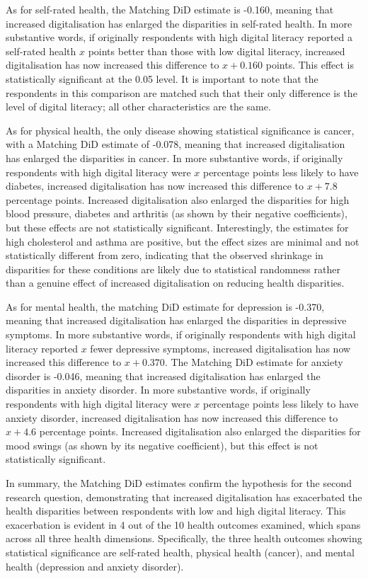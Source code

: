 As for self-rated health, the Matching DiD estimate is -0.160, meaning that increased digitalisation has enlarged the disparities in self-rated health. In more substantive words, if originally respondents with high digital literacy reported a self-rated health $x$ points better than those with low digital literacy, increased digitalisation has now increased this difference to $x + 0.160$ points. This effect is statistically significant at the 0.05 level. It is important to note that the respondents in this comparison are matched such that their only difference is the level of digital literacy; all other characteristics are the same.

As for physical health, the only disease showing statistical significance is cancer, with a Matching DiD estimate of -0.078, meaning that increased digitalisation has enlarged the disparities in cancer. In more substantive words, if originally respondents with high digital literacy were $x$ percentage points less likely to have diabetes, increased digitalisation has now increased this difference to $x + 7.8$ percentage points. Increased digitalisation also enlarged the disparities for high blood pressure, diabetes and arthritis (as shown by their negative coefficients), but these effects are not statistically significant. Interestingly, the estimates for high cholesterol and asthma are positive, but the effect sizes are minimal and not statistically different from zero, indicating that the observed shrinkage in disparities for these conditions are likely due to statistical randomness rather than a genuine effect of increased digitalisation on reducing health disparities.

As for mental health, the matching DiD estimate for depression is -0.370, meaning that increased digitalisation has enlarged the disparities in depressive symptoms. In more substantive words, if originally respondents with high digital literacy reported $x$ fewer depressive symptoms, increased digitalisation has now increased this difference to $x + 0.370$. The Matching DiD estimate for anxiety disorder is -0.046, meaning that increased digitalisation has enlarged the disparities in anxiety disorder. In more substantive words, if originally respondents with high digital literacy were $x$ percentage points less likely to have anxiety disorder, increased digitalisation has now increased this difference to $x + 4.6$ percentage points. Increased digitalisation also enlarged the disparities for mood swings (as shown by its negative coefficient), but this effect is not statistically significant.

In summary, the Matching DiD estimates confirm the hypothesis for the second research question, demonstrating that increased digitalisation has exacerbated the health disparities between respondents with low and high digital literacy. This exacerbation is evident in 4 out of the 10 health outcomes examined, which spans across all three health dimensions. Specifically, the three health outcomes showing statistical significance are self-rated health, physical health (cancer), and mental health (depression and anxiety disorder).
